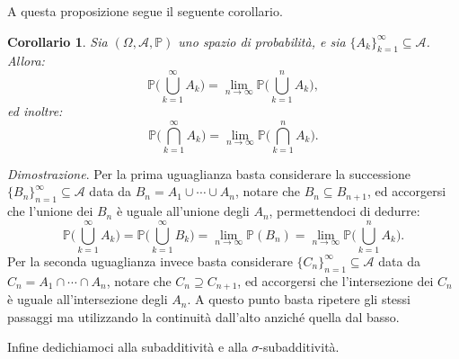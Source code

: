 \documentclass[11pt]{book}
\makeatletter
\theoremstyle{Definizione}
\theoremstyle{TeoremaProposizioneLemmaCorollario}
\newtheorem{mycor}[myteo]{Corollario}
\theoremstyle{OsservazioneNota}
\renewenvironment{proof}[1][\proofname]{\par
  \normalfont \topsep6\p@\@plus6\p@\relax
  \trivlist
  \item[\hskip\labelsep
        \itshape
    #1\@addpunct{.}]\ignorespaces
}{%
  \endtrivlist\@endpefalse
}
\renewcommand{\P}{\mathbb{P}}
\renewenvironment{proof}{\textsl{Dimostrazione}.}{}
\makeatother
\begin{document}
A questa proposizione segue il seguente corollario.
\begin{boxoss}
\begin{mycor}\label{cor:CorollarioContinuitàBassoContinuitàAlto}
Sia $(\Omega,\mathcal{A},\P)$ uno spazio di probabilità, e sia $\{A_k\}_{k = 1}^\infty\subseteq \mathcal{A}$. Allora:
$$
\P\Bigg(\bigcup_{k = 1}^\infty A_k\Bigg) = \lim_{n \to \infty} \P\Bigg(\bigcup_{k = 1}^n A_k\Bigg),
$$
ed inoltre:
$$
\P\Bigg(\bigcap_{k = 1}^\infty A_k\Bigg) = \lim_{n \to \infty} \P\Bigg(\bigcap_{k = 1}^n A_k\Bigg).
$$
\end{mycor}
\tcblower
\begin{proof}
Per la prima uguaglianza basta considerare la successione $\{B_n\}_{n = 1}^\infty \subseteq \mathcal{A}$ data da $B_n = A_1 \cup \cdots \cup A_n$, notare che $B_n \subseteq B_{n+1}$, ed accorgersi che l'unione dei $B_n$ è uguale all'unione degli $A_n$, permettendoci di dedurre:
$$
\P\Bigg(\bigcup_{k = 1}^\infty A_k\Bigg) = \P\Bigg(\bigcup_{k = 1}^\infty B_k\Bigg) = \lim_{n \to \infty} \P(B_n) = \lim_{n \to \infty} \P\Bigg(\bigcup_{k = 1}^n A_k\Bigg).
$$
Per la seconda uguaglianza invece basta considerare $\{C_n\}_{n = 1}^\infty\subseteq \mathcal{A}$ data da $C_n = A_1 \cap \cdots \cap A_n$, notare che $C_n \supseteq C_{n+1}$, ed accorgersi che l'intersezione dei $C_n$ è uguale all'intersezione degli $A_n$. A questo punto basta ripetere gli stessi passaggi ma utilizzando la continuità dall'alto anziché quella dal basso.
\end{proof}
\end{boxoss}
Infine dedichiamoci alla subadditività e alla $\sigma$-subadditività.
\end{document}
